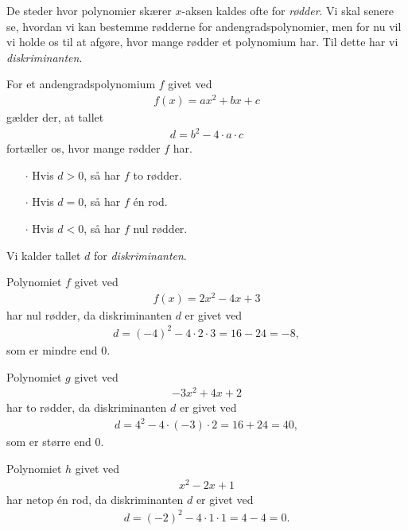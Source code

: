 De steder hvor polynomier skærer $x$-aksen kaldes ofte for \textit{rødder}. Vi skal senere se, hvordan vi kan bestemme rødderne for andengradspolynomier, men for nu vil vi holde os til at afgøre, hvor mange rødder et polynomium har. Til dette har vi \textit{diskriminanten}.
\begin{setn}[Diskriminanten]
	For et andengradspolynomium $f$ givet ved
	\begin{align*}
		f(x) = ax^2+bx+c
	\end{align*}
	gælder der, at tallet 
	\begin{align*}
		d = b^2 - 4\cdot a\cdot c
	\end{align*}
	fortæller os, hvor mange rødder $f$ har. 
	\begin{itemize}
		\item[$\cdot$] Hvis $d > 0$, så har $f$ to rødder.
		\item[$\cdot$] Hvis $d = 0$, så har $f$ én rod.
		\item[$\cdot$] Hvis $d < 0$, så har $f$ nul rødder. 
	\end{itemize}
\end{setn}
Vi kalder tallet $d$ for \textit{diskriminanten}.

\begin{exa}
	Polynomiet $f$ givet ved
	\begin{align*}
		f(x) = 2x^2-4x+3
	\end{align*}
	har nul rødder, da diskriminanten $d$ er givet ved
	\begin{align*}
		d = (-4)^2 - 4\cdot 2\cdot 3 = 16-24 = -8,
	\end{align*}
	som er mindre end 0.
\end{exa}
\begin{exa}
	Polynomiet $g$ givet ved
	\begin{align*}
		-3x^2 + 4x+2
	\end{align*}
	har to rødder, da diskriminanten $d$ er givet ved
	\begin{align*}
		d = 4^2 -4\cdot (-3)\cdot 2 = 16 + 24 = 40,
	\end{align*}
	som er større end 0.
\end{exa}
\begin{exa}
	Polynomiet $h$ givet ved
	\begin{align*}
		x^2 - 2x + 1
	\end{align*}
	har netop én rod, da diskriminanten $d$ er givet ved
	\begin{align*}
		d = (-2)^2 - 4\cdot 1 \cdot 1 = 4 - 4 = 0.
	\end{align*}
\end{exa}


